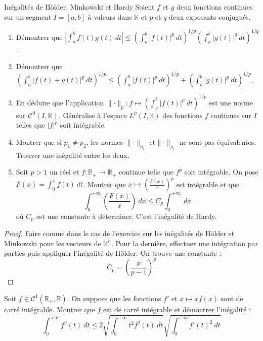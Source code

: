 \documentclass[french,a4paper]{article}
\newcommand{\R}{\mathbb{R}}
\newcommand{\K}{\mathbb{K}}
\theoremstyle{plain}
\theoremstyle{definition}
\theoremstyle{remark}
\begin{document}
\begin{ex}[Châteaux]{Inégalités de Hölder, Minkowski et Hardy}
	Soient $f$ et $g$ deux fonctions continues sur un segment $I=[a,b]$ à valeurs dans $\K$ et $p$ et $q$ deux exposants conjugués.
	\begin{enumerate}
		\item Démontrer que $\displaystyle\left\lvert\int_{a}^{b}f(t)g(t)\ dt\right\rvert\leqslant\left(\int_{a}^{b}\lvert f(t)\rvert^p\ dt\right)^{1/p}\left(\int_{a}^{b}\lvert g(t)\rvert^q\ dt\right)^{1/q}$.
		\item Démontrer que $\displaystyle\left(\int_{a}^{b}\lvert f(t)+g(t)\rvert^p\ dt\right)^{1/p}\leqslant\left(\int_{a}^{b}\lvert f(t)\rvert^p\ dt\right)^{1/p}+\left(\int_{a}^{b}\lvert g(t)\rvert^p\ dt\right)^{1/p}$.
		\item En déduire que l'application $\lVert\cdot\rVert_p:f\mapsto\displaystyle\left(\int_{a}^{b}\lvert f(t)\rvert^p\ dt\right)^{1/p}$ est une norme sur $\mathcal{C}^0(I,\K)$. Généralise à l'espace $L^p(I,\K)$ des fonctions $f$ continues sur $I$ telles que $\lvert f\rvert^p$ soit intégrable.
		\item Montrer que si $p_1\ne p_2$, les normes $\lVert\cdot\rVert_{p_1}$ et$ \lVert\cdot\rVert_{p_1}$ ne sont pas équivalentes. Trouver une inégalité entre les deux.
		\item Soit $p>1$ un réel et $f:\R_+\to\R_+$ continue telle que $f^p$ soit intégrable. On pose $F(x)=\displaystyle\int_{0}^{x}f(t)\ dt$. Montrer que $x\mapsto\displaystyle\left(\frac{F(x)}{x}\right)^p$ est intégrable et que $$\int_{0}^{+\infty}\left(\frac{F(x)}{x}\right)\ dx\leqslant C_p\int_{0}^{+\infty}\ dx$$ où $C_p$ est une constante à déterminer. C'est l'inégalité de Hardy.
	\end{enumerate}
\end{ex}
\begin{proof}
	Faire comme dans le cas de l'exercice sur les inégalités de Hölder et Minkowski pour les vecteurs de $\K^n$. Pour la dernière, effectuer une intégration par parties puis appliquer l'inégalité de Hölder. On trouve une constante : $$C_p=\left(\frac{p}{p-1}\right)^p$$
\end{proof}

\begin{ex}[Moulin.IG.43]{}
	Soit $f\in\mathcal{C}^1(\R_+,\R)$. On suppose que les fonctions $f'$ et $x\mapsto xf(x)$ sont de carré intégrable. Montrer que $f$ est de carré intégrable et démontrer l'inégalité : $$\int_{0}^{+\infty}f^2(t)\ dt\leqslant2\sqrt{\int_{0}^{+\infty}t^2f^2(t)\ dt}\sqrt{\int_{0}^{+\infty}f'(t)^2\ dt}$$
\end{ex}
\end{document}
